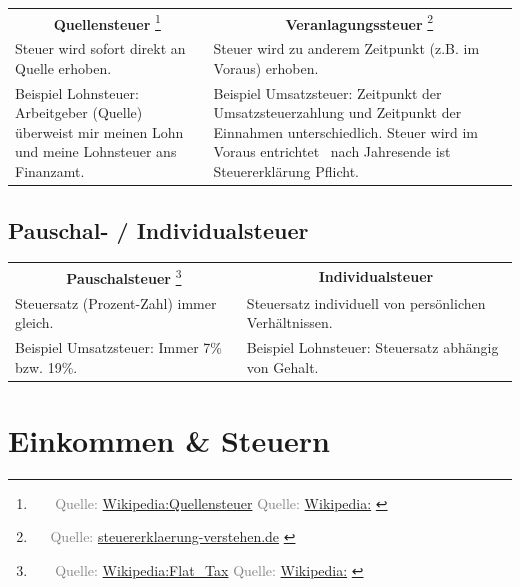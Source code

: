 \documentclass{beamer}
\let\oldfootnote\footnote
\renewcommand{\footnote}[1]
{%
	\oldfootnote
	{
		\tiny
		\textcolor{gray}{\ #1}
	}%
}
\newcommand{\citewiki}[2][]
{%
	\footnote
	{
		\ifthenelse{\isempty{#1}}
		{
			Quelle: \href{https://de.wikipedia.org/wiki/#2}{Wikipedia:#2}
		}
		{
			Quelle: \href{https://de.wikipedia.org/wiki/#2}{Wikipedia:#1}
		}
	}
}
\newcommand{\citeurl}[2]
{%
	\footnote{Quelle: \href{#1}{#2}}
}
\begin{document}
			\begin{frame}
				\begin{tabularx}{\linewidth}{X|X}
					\multicolumn{1}{c|}{\textbf{Quellensteuer}\citewiki{Quellensteuer}} &
					\multicolumn{1}{c}{\textbf{Veranlagungssteuer}\citeurl{https://www.steuererklaerung-verstehen.de/lexikon/veranlagungssteuer}{steuererklaerung-verstehen.de}} \\[0.25cm]
					Steuer wird sofort direkt an Quelle erhoben. & Steuer wird zu anderem Zeitpunkt (z.B. im Voraus) erhoben.\\
					\vspace{0.25cm} Beispiel Lohnsteuer:\newline
						Arbeitgeber (Quelle) überweist mir meinen Lohn und meine Lohnsteuer ans Finanzamt. &
					\vspace{0.25cm} Beispiel Umsatzsteuer:\newline
						Zeitpunkt der Umsatzsteuerzahlung und Zeitpunkt der Einnahmen unterschiedlich. Steuer wird im Voraus entrichtet \textrightarrow\ nach Jahresende ist Steuererklärung Pflicht.
				\end{tabularx}
			\end{frame}
		
		\subsection{Pauschal- / Individualsteuer}
		
			\begin{frame}
				\begin{tabularx}{\linewidth}{X|X}
					\multicolumn{1}{c|}{\textbf{Pauschalsteuer}\citewiki{Flat\_Tax}} &
					\multicolumn{1}{c}{\textbf{Individualsteuer}} \\[0.25cm]
					Steuersatz (Prozent-Zahl) immer gleich. & Steuersatz individuell von persönlichen Verhältnissen.\\
					\vspace{0.25cm} Beispiel Umsatzsteuer:\newline
						Immer 7\% bzw. 19\%. &
					\vspace{0.25cm} Beispiel Lohnsteuer:\newline
						Steuersatz abhängig von Gehalt.
				\end{tabularx}
			\end{frame}
	
	\section{Einkommen \& Steuern}
	
\end{document}
